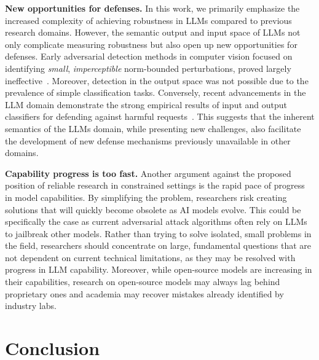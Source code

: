\textbf{New opportunities for defenses.} In this work, we primarily emphasize the increased complexity of achieving robustness in LLMs compared to previous research domains. However, the semantic output and input space of LLMs not only complicate measuring robustness but also open up new opportunities for defenses. Early adversarial detection methods in computer vision focused on identifying \textit{small}, \textit{imperceptible} norm-bounded perturbations, proved largely ineffective~\cite{carlini2017adversarial}. Moreover, detection in the output space was not possible due to the prevalence of simple classification tasks. Conversely, recent advancements in the LLM domain demonstrate the strong empirical results of input and output classifiers for defending against harmful requests~\cite{kim2023robust, sharma2025constitutional}. This suggests that the inherent semantics of the LLMs domain, while presenting new challenges, also facilitate the development of new defense mechanisms previously unavailable in other domains.

\textbf{Capability progress is too fast.} Another argument against the proposed position of reliable research in constrained settings is the rapid pace of progress in model capabilities. By simplifying the problem, researchers risk creating solutions that will quickly become obsolete as AI models evolve. This could be specifically the case as current adversarial attack algorithms often rely on LLMs to jailbreak other models. Rather than trying to solve isolated, small problems in the field, researchers should concentrate on large, fundamental questions that are not dependent on current technical limitations, as they may be resolved with progress in LLM capability. Moreover, while open-source models are increasing in their capabilities, research on open-source models may always lag behind proprietary ones and academia may recover mistakes already identified by industry labs. 

\vspace{-10pt}
\section{Conclusion}


